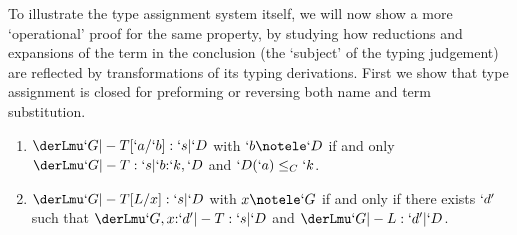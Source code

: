 \documentclass{CSML}
\begin{document}
\noindent To illustrate the type assignment system itself, we will now show a more `operational' proof for the same property, by studying how reductions and expansions of the term in the conclusion (the `subject' of the typing judgement) are reflected by transformations of its typing derivations.
First we show that type assignment is closed for preforming or reversing both name and term substitution.

 \begin{lem} \label{lem:substitution}\hfill
 \begin{enumerate}
\item \label{lem:substitution-name}
	$\derLmu `G |- T[`a/`b] : `s | `D $ with $`b \notele `D $ if and only $\derLmu `G |- T : `s | `b {:}`k,`D $ and $`D(`a) \leq_C `k$.
\item \label{lem:substitution-term}
	$\derLmu `G |- T[L/x] : `s | `D $ with $x\notele `G$ if and only if there exists $`d'$ such that $\derLmu `G,x{:}`d' |- T : `s | `D $ and $\derLmu `G |- L : `d' | `D $.
 \end{enumerate}
 \end{lem}
\end{document}

